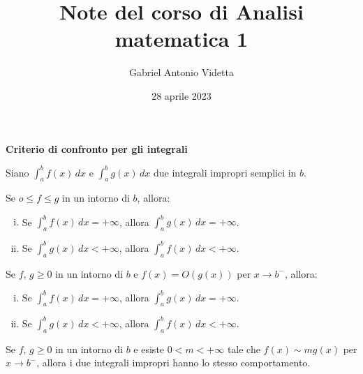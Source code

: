 \documentclass[11pt]{article}
\title{\textbf{Note del corso di Analisi matematica 1}}
\author{Gabriel Antonio Videtta}
\date{28 aprile 2023}
\begin{document}
	
	\maketitle
	
	\begin{center}
		\Large \textbf{Criterio di confronto per gli integrali}
	\end{center}

	\wip
	
	Siano $\int_a^b f(x) \, dx$ e $\int_a^b g(x) \, dx$ due integrali
	impropri semplici in $b$.
	
	\begin{proposition}
		Se $o \leq f \leq g$ in un intorno di $b$, allora:
		
		\begin{enumerate}[(i)]
			\item Se $\int_a^b f(x) \, dx = +\infty$, allora
			$\int_a^b g(x) \, dx = +\infty$.
			
			\item Se $\int_a^b g(x) \, dx < +\infty$, allora
			$\int_a^b f(x) \, dx < +\infty$.
		\end{enumerate}
	\end{proposition}

	\begin{proposition} 
		Se $f$, $g \geq 0$ in un intorno di $b$ e $f(x) = O(g(x))$
		per $x \to b^-$, allora:
		
		\begin{enumerate}[(i)]
			\item Se $\int_a^b f(x) \, dx = +\infty$, allora
			$\int_a^b g(x) \, dx = +\infty$.
			
			\item Se $\int_a^b g(x) \, dx < +\infty$, allora
			$\int_a^b f(x) \, dx < +\infty$.
		\end{enumerate}
	\end{proposition}

	\begin{proposition} 
		Se $f$, $g \geq 0$ in un intorno di $b$ e esiste $0 < m < +\infty$ tale
		che $f(x) \sim m g(x)$ per $x \to b^-$, allora i due integrali
		impropri hanno lo stesso comportamento.
	\end{proposition}
\end{document}
